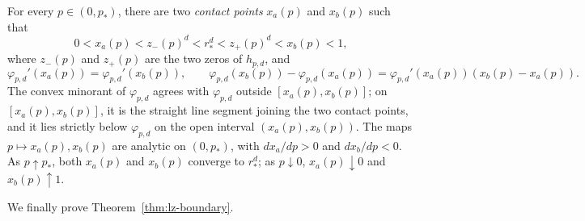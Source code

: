 \begin{lemma}\label{lem:contact-points}
For every $p\in(0,p_*)$, there are two \emph{contact points} $x_a(p)$ and $x_b(p)$ such that
\[
  0<x_a(p)<z_-(p)^d<r_*^d<z_+(p)^d<x_b(p)<1,
\]
where $z_-(p)$ and $z_+(p)$ are the two zeros of $h_{p,d}$, and
\begin{equation}\label{eq:contact-identity}
  \varphi_{p,d}'(x_a(p))=\varphi_{p,d}'(x_b(p)),
  \qquad
  \varphi_{p,d}(x_b(p))-\varphi_{p,d}(x_a(p))
  =\varphi_{p,d}'(x_a(p))(x_b(p)-x_a(p)).
\end{equation}
The convex minorant of $\varphi_{p,d}$ agrees with $\varphi_{p,d}$ outside
$[x_a(p),x_b(p)]$; on $[x_a(p),x_b(p)]$, it is the straight line segment joining
the two contact points, and it lies strictly below $\varphi_{p,d}$ on the open
interval $(x_a(p),x_b(p))$.  The maps $p\mapsto x_a(p),x_b(p)$ are analytic on
$(0,p_*)$, with $dx_a/dp>0$ and $dx_b/dp<0$.
As $p\uparrow p_*$, both $x_a(p)$ and $x_b(p)$ converge to $r_*^d$;
as $p\downarrow0$, $x_a(p)\downarrow0$ and $x_b(p)\uparrow1$.
\end{lemma}

We finally prove Theorem~\ref{thm:lz-boundary}.

